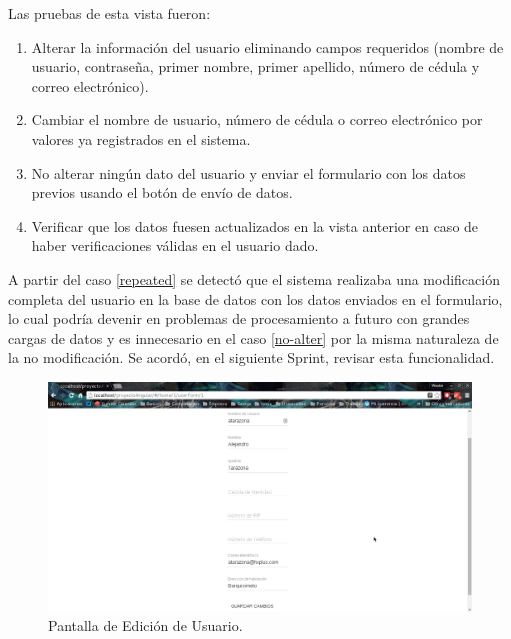     Las pruebas de esta vista fueron:
    \begin{enumerate}
        \item\label{required} Alterar la información del usuario eliminando campos requeridos (nombre de usuario, contraseña, primer nombre, primer apellido, número de cédula y correo electrónico).
        \item\label{repeated} Cambiar el nombre de usuario, número de cédula o correo electrónico por valores ya registrados en el sistema.
        \item\label{no-alter} No alterar ningún dato del usuario y enviar el formulario con los datos previos usando el botón de envío de datos.
        \item\label{details} Verificar que los datos fuesen actualizados en la vista anterior en caso de haber verificaciones válidas en el usuario dado.
    \end{enumerate}
    
    A partir del caso \ref{repeated} se detectó que el sistema realizaba una modificación completa del usuario en la base de datos con los datos enviados en el formulario, lo cual podría devenir en problemas de procesamiento a futuro con grandes cargas de datos y es innecesario en el caso \ref{no-alter} por la misma naturaleza de la no modificación. Se acordó, en el siguiente Sprint, revisar esta funcionalidad.
    
    \begin{figure}[htbp!]
        \begin{center}
            \includegraphics[width=.9\textwidth]{figures/p5}
        \end{center}
        \caption{Pantalla de Edición de Usuario.}
        \label{Edición}
    \end{figure}
    
